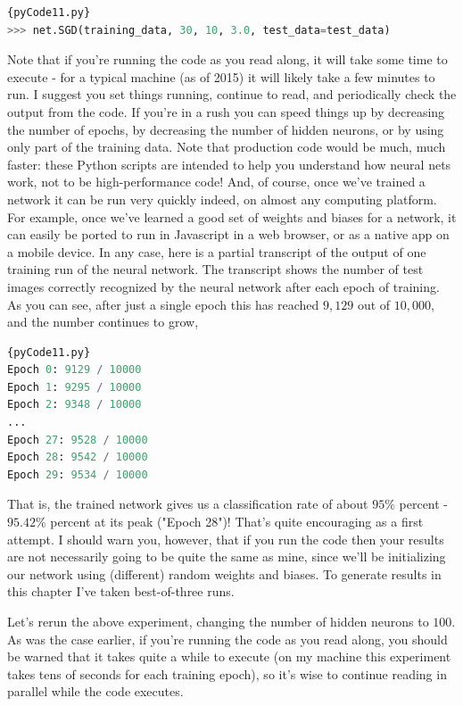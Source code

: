 \documentclass[a4paper,12pt]{report}%
\begin{document}
\begin{lstlisting}[language=Python,breaklines,basicstyle=\footnotesize\ttfamily]{pyCode11.py}
>>> net.SGD(training_data, 30, 10, 3.0, test_data=test_data)
\end{lstlisting}

Note that if you're running the code as you read along, it will take some time to execute - for a typical machine (as of 2015) it will likely take a few minutes to run. I suggest you set things running, continue to read, and periodically check the output from the code. If you're in a rush you can speed things up by decreasing the number of epochs, by decreasing the number of hidden neurons, or by using only part of the training data. Note that production code would be much, much faster: these Python scripts are intended to help you understand how neural nets work, not to be high-performance code! And, of course, once we've trained a network it can be run very quickly indeed, on almost any computing platform. For example, once we've learned a good set of weights and biases for a network, it can easily be ported to run in Javascript in a web browser, or as a native app on a mobile device. In any case, here is a partial transcript of the output of one training run of the neural network. The transcript shows the number of test images correctly recognized by the neural network after each epoch of training. As you can see, after just a single epoch this has reached $9,129$ out of $10,000$, and the number continues to grow,

\begin{lstlisting}[language=Python,breaklines,basicstyle=\footnotesize\ttfamily]{pyCode11.py}
Epoch 0: 9129 / 10000
Epoch 1: 9295 / 10000
Epoch 2: 9348 / 10000
...
Epoch 27: 9528 / 10000
Epoch 28: 9542 / 10000
Epoch 29: 9534 / 10000
\end{lstlisting}


That is, the trained network gives us a classification rate of about $95\%$ percent - $95.42\%$ percent at its peak ("Epoch 28")! That's quite encouraging as a first attempt. I should warn you, however, that if you run the code then your results are not necessarily going to be quite the same as mine, since we'll be initializing our network using (different) random weights and biases. To generate results in this chapter I've taken best-of-three runs.

Let's rerun the above experiment, changing the number of hidden neurons to $100$. As was the case earlier, if you're running the code as you read along, you should be warned that it takes quite a while to execute (on my machine this experiment takes tens of seconds for each training epoch), so it's wise to continue reading in parallel while the code executes.
\end{document}
